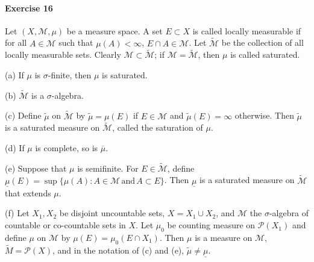 \paragraph{Exercise 16}
Let $(X,\mathcal{M},\mu)$ be a measure space. A set $E\subset X$ is called locally measurable if for all $A\in\mathcal{M}$ such that $\mu(A)<\infty$, $E\cap A\in\mathcal{M}$. Let $\widetilde{\mathcal{M}}$ be the collection of all locally measurable sets. Clearly $\mathcal{M}\subset\widetilde{\mathcal{M}}$; if $\mathcal{M}=\widetilde{\mathcal{M}}$, then $\mu$ is called saturated.
\par(a) If $\mu$ is $\sigma$-finite, then $\mu$ is saturated.
\par(b) $\widetilde{\mathcal{M}}$ is a $\sigma$-algebra.
\par(c) Define $\widetilde{\mu}$ on $\widetilde{\mathcal{M}}$ by $\widetilde{\mu}=\mu(E)$ if $E\in\mathcal{M}$ and $\widetilde{\mu}(E)=\infty$ otherwise. Then $\widetilde{\mu}$ is a saturated measure on $\widetilde{\mathcal{M}}$, called the saturation of $\mu$.
\par(d) If $\mu$ is complete, so is $\overline{\mu}$.
\par(e) Suppose that $\mu$ is semifinite. For $E\in\widetilde{\mathcal{M}}$, define $\underline{\mu}(E)=\sup\{\mu(A):A\in\mathcal{M}\,\text{and}\,A\subset E\}$. Then $\underline{\mu}$ is a saturated measure on $\widetilde{\mathcal{M}}$ that extends $\mu$.
\par(f) Let $X_1, X_2$ be disjoint uncountable sets, $X=X_1\cup X_2$, and $\mathcal{M}$ the $\sigma$-algebra of countable or co-countable sets in $X$. Let $\mu_0$ be counting measure on $\mathcal{P}(X_1)$ and define $\mu$ on $\mathcal{M}$ by $\mu(E)=\mu_0(E\cap X_1)$. Then $\mu$ is a measure on $\mathcal{M}$, $\widetilde{M}=\mathcal{P}(X)$, and in the notation of (c) and (e), $\widetilde{\mu}\neq\underline{\mu}$.
